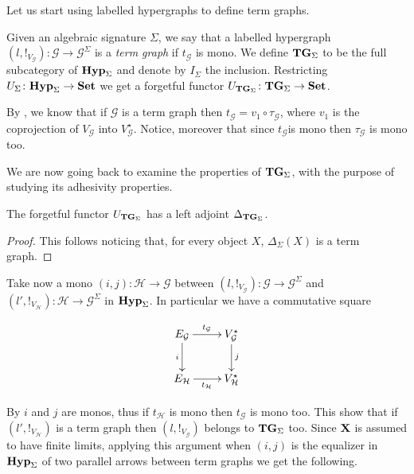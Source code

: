 \documentclass[runningheads,envcountsect]{llncs}
\def\X{\textbf {\textup{X}}}
\newcommand{\catname}[1]{\textbf{\textup{#1}}}
\newcommand{\hyp}{\catname{Hyp}}
\newcommand{\tg}[0]{\catname{TG}_{\Sigma}}
\begin{document}
Let us start using labelled hypergraphs to define term graphs.

\begin{definition}\label{def:tg}
	Given an algebraic signature $\Sigma$, we say that a labelled hypergraph $(l, !_{V_\mathcal{G}})\colon \mathcal{G}\to \mathcal{G}^{\Sigma}$ is a \emph{term graph} if $t_\mathcal{G}$ is mono. We define $\tg$ to be the full subcategory of $\hyp_{\Sigma}$ and denote by $I_\Sigma$ the inclusion. Restricting $U_\Sigma\colon \hyp_{\Sigma}\to \catname{Set}$ we get a forgetful functor $U_{\tg}\colon \tg\to \catname{Set}$.
\end{definition}


\begin{remark}\label{rem:mono2}By , we know that if $\mathcal{G}$ is a term graph then $t_{\mathcal{G}}=v_1\circ \tau_{\mathcal{G}}$, where $v_1$ is the coprojection of $V_{\mathcal{G}}$ into $V^\star_{\mathcal{G}}$.  Notice, moreover that since $t_{\mathcal{G}}$is mono then $\tau_{\mathcal{G}}$ is mono too.
\end{remark}

We are now going back to examine the properties of $\tg$, with the purpose of studying its adhesivity properties.

\begin{proposition}\label{term:left}The forgetful functor $U_{\tg}$ has a left adjoint $\Delta_{\tg}$.
\end{proposition}
\begin{proof}
	This follows noticing that, for every object $X$, $\Delta_{\Sigma}(X)$ is a term graph.
\end{proof}

Take now a mono $(i,j)\colon \mathcal{H}\to \mathcal{G}$ between  $(l, !_{V_\mathcal{G}})\colon \mathcal{G}\to \mathcal{G}^{\Sigma}$ and $(l', !_{V_\mathcal{H}})\colon \mathcal{H}\to \mathcal{G}^{\Sigma}$ in $\hyp_\Sigma$. In particular we have a commutative square

\[\xymatrix{E_{\mathcal{G}} \ar[r]^{t_{\mathcal{G}}} \ar[d]_{i}& V^\star_{\mathcal{G}} \ar[d]^{j} \\ E_{\mathcal{H}} \ar[r]_{t_{\mathcal{H}}} & V^\star_{\mathcal{H}}}\]

By   $i$ and $j$ are monos, thus if $t_{\mathcal{H}}$ is mono then $t_{\mathcal{G}}$  is mono too. This show that if $(l', !_{V_\mathcal{H}})$ is a term graph then $(l, !_{V_\mathcal{G}})$ belongs to $\tg$ too.  Since $\X$ is assumed to have finite limits, applying this argument when $(i,j)$ is the equalizer in $\hyp_\Sigma$ of two parallel arrows between term graphs we get the following.
\end{document}
